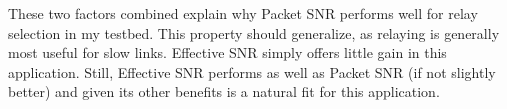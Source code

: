 These two factors combined explain why Packet SNR performs well for relay selection in my testbed. This property should generalize, as relaying is generally most useful for slow links. Effective SNR simply offers little gain in this application. Still, Effective SNR performs as well as Packet SNR (if not slightly better) and given its other benefits is a natural fit for this application. %

%
